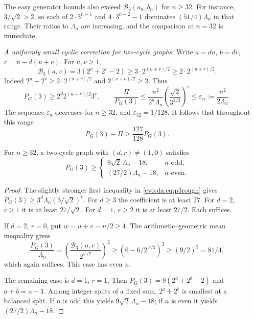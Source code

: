 \documentclass[11pt,a4paper]{article}
\numberwithin{equation}{section}
\theoremstyle{definition}
\theoremstyle{remark}
\newcommand{\Bip}{\mathcal B}
\begin{document}
The easy generator bounds also exceed $\Bip_3(a_n,b_n)$ for $n\ge32$. For
instance, $3/\sqrt2>2$, so each of $2\cdot3^{n-1}$ and $4\cdot3^{n-2}-1$
dominates $(51/4)\Lambda_n$ in that range. Their ratios to $\Lambda_n$ are
increasing, and the comparison at $n=32$ is immediate.

\emph{A uniformly small cyclic correction for two-cycle graphs.} Write
$a=du$, $b=dv$, $r=n-d(u+v)$. For $u,v\ge1$,
\begin{equation}\label{evo:da:eq:p3rough}
 \Bip_3(u,v)=3(2^u+2^v-2)\ge3\cdot2^{(u+v)/2}\ge2\cdot2^{(u+v)/2}.
\end{equation}
Indeed $2^u+2^v\ge2\cdot2^{(u+v)/2}$ and $2^{(u+v)/2}\ge2$. Thus
\[
 P_G(3)\ge2^d2^{(n-r)/2}3^r,\qquad
 \frac{\Pi}{P_G(3)}\le
 \frac{n^2}{2^d\Lambda_n}\left(\frac{\sqrt2}{3^{2/3}}\right)^r
 \le\varepsilon_n:=\frac{n^2}{2\Lambda_n}.
\]
The sequence $\varepsilon_n$ decreases for $n\ge32$, and
$\varepsilon_{32}=1/128$. It follows that throughout this range
\begin{equation}\label{evo:da:eq:127}
 P_G(3)-\Pi\ge\frac{127}{128}P_G(3).
\end{equation}

\begin{lemma}[Manuscript~03]\label{evo:da:lem:nonspan3}
For $n\ge32$, a two-cycle graph with $(d,r)\ne(1,0)$ satisfies
\begin{equation}\label{evo:da:eq:nonspanbounds}
P_G(3)\ge
\begin{cases}
9\sqrt2\,\Lambda_n-18,&n\text{ odd},\\
(27/2)\Lambda_n-18,&n\text{ even}.
\end{cases}
\end{equation}
\end{lemma}
\begin{proof}
The slightly stronger first inequality in \eqref{evo:da:eq:p3rough} gives
$P_G(3)\ge3^d\Lambda_n(3/\sqrt2)^r$. For $d\ge3$ the coefficient is at least
$27$. For $d=2$, $r\ge1$ it is at least $27/\sqrt2$. For $d=1$, $r\ge2$ it is
at least $27/2$. Each suffices.

If $d=2$, $r=0$, put $w=u+v=n/2\ge4$. The arithmetic--geometric mean
inequality gives
\[
\frac{P_G(3)}{\Lambda_n}
=\left(\frac{\Bip_3(u,v)}{2^{w/2}}\right)^2
\ge(6-6/2^{w/2})^2\ge(9/2)^2=81/4,
\]
which again suffices. This case has even $n$.

The remaining case is $d=1$, $r=1$. Then $P_G(3)=9(2^a+2^b-2)$ and
$a+b=n-1$. Among integer splits of a fixed sum, $2^a+2^b$ is smallest at a
balanced split. If $n$ is odd this yields $9\sqrt2\,\Lambda_n-18$; if $n$ is
even it yields $(27/2)\Lambda_n-18$.
\end{proof}
\end{document}
